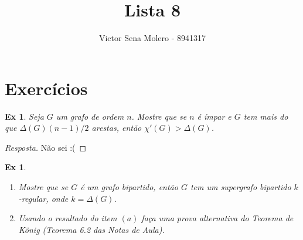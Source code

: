 \documentclass[12pt]{article}
\newcounter{exCounter}
\newtheorem{ex}[exCounter]{Ex}
\begin{document}
 
 
\title{Lista 8}
\author{Victor Sena Molero - 8941317}
\maketitle

\section{Exercícios}
\begin{ex}
Seja $G$ um grafo de ordem $n$. Mostre que se $n$ é ímpar e $G$ tem mais do que $\Delta(G)(n-1)/2$ arestas, então $\chi'(G) > \Delta(G)$.
\end{ex}

\begin{proof}[Resposta]
Não sei :(
\end{proof}

\begin{ex}
\begin{enumerate}[label=(\alph*)]
    \item Mostre que se $G$ é um grafo bipartido, então $G$ tem um supergrafo bipartido $k$-regular, onde $k = \Delta(G)$.
    \item Usando o resultado do item $(a)$ faça uma prova alternativa do Teorema de König (Teorema 6.2 das Notas de Aula).
\end{enumerate}
\end{ex}
\end{document}
